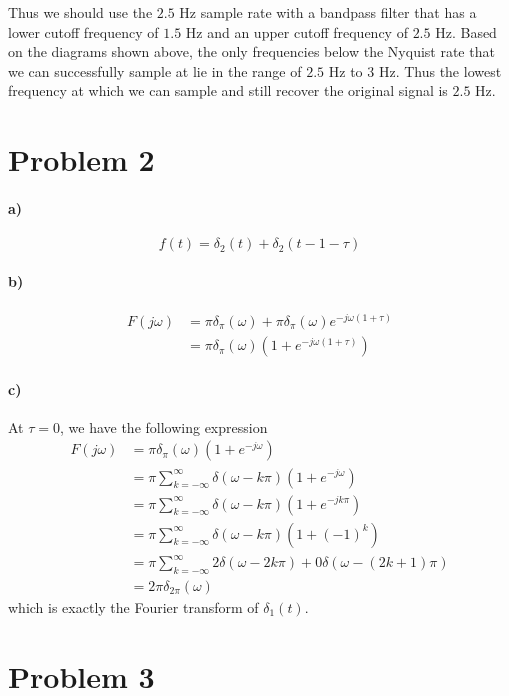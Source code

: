 \documentclass[12pt]{article}
\begin{document}
Thus we should use the \(2.5\) Hz sample rate with a bandpass filter that has a lower cutoff frequency of \(1.5\) Hz and an upper cutoff frequency of \(2.5\) Hz. Based
on the diagrams shown above, the only frequencies below the Nyquist rate that we can successfully sample at lie in the range of \(2.5\) Hz to \(3\) Hz. Thus the
lowest frequency at which we can sample and still recover the original signal is \(2.5\) Hz.

\section*{Problem 2}

\paragraph{a)}

\[f(t)=\delta_2(t)+\delta_2(t-1-\tau)\]

\paragraph{b)}

\begin{align*}
    F(j\omega)&=\pi\delta_\pi(\omega)+\pi\delta_\pi(\omega)e^{-j\omega(1+\tau)}\\
    &=\pi\delta_\pi(\omega)\left(1+e^{-j\omega(1+\tau)}\right)
\end{align*}

\paragraph{c)}

At \(\tau=0\), we have the following expression
\begin{align*}
    F(j\omega)&=\pi\delta_\pi(\omega)(1+e^{-j\omega})\\
    &=\pi\sum_{k=-\infty}^\infty \delta(\omega-k\pi)(1+e^{-j\omega})\\
    &=\pi\sum_{k=-\infty}^\infty \delta(\omega-k\pi)(1+e^{-jk\pi})\\
    &=\pi\sum_{k=-\infty}^\infty \delta(\omega-k\pi)(1+(-1)^k)\\
    &=\pi\sum_{k=-\infty}^\infty 2\delta(\omega-2k\pi) + 0\delta(\omega-(2k+1)\pi)\\
    &=2\pi\delta_{2\pi}(\omega)
\end{align*}
which is exactly the Fourier transform of \(\delta_1(t)\).

\section*{Problem 3}
\end{document}

